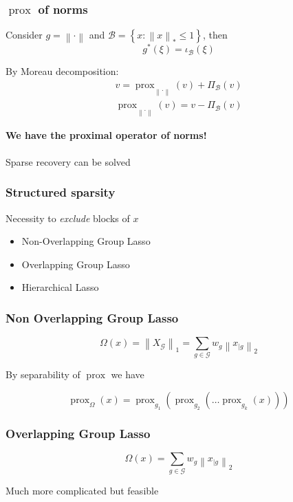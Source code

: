 \documentclass[aspectratio=169]{beamer}
\DeclareMathOperator{\Prox}{prox}
\newcommand{\prox}[2]{\Prox_{#1}\left({#2}\right)}
\newcommand{\norm}[1]{\left\|#1\right\|}
\begin{document}
		\begin{frame}
		\frametitle{$\Prox$ of norms}
		Consider $g = \norm{\cdot}$ and $\mathcal{B} = \left\{x : \norm{x}_*\le 1 \right\}$, then
		\begin{equation}
		\nonumber g^* \left(\xi\right) = \iota_\mathcal{B}\left(\xi\right)
		\end{equation}
		
		By Moreau decomposition:
		\begin{gather}
		\nonumber v = \prox{\norm{\cdot}}{v} + \Pi_{\mathcal{B}}(v)\\
		\nonumber \prox{\norm{\cdot}}{v} = v - \Pi_{\mathcal{B}}(v)
		\end{gather}
		\pause
		\begin{center}
		\textbf{We have the proximal operator of norms!}
		\quad \\ \quad \\
		
		Sparse recovery can be solved
		\end{center}
		\end{frame}
		
		\begin{frame}
		\frametitle{Structured sparsity}
		Necessity to \emph{exclude} blocks of $x$
		
		\begin{itemize}
		\item Non-Overlapping Group Lasso
		\item Overlapping Group Lasso
		\item Hierarchical Lasso
		\end{itemize}
		\end{frame}
		
		\begin{frame}
		\frametitle{Non Overlapping Group Lasso}
		\begin{equation}
		\nonumber \Omega(x) = \norm{X_\mathcal{G}}_1 = \sum_{g\in\mathcal{G}} w_g \norm{x_{|g}}_2
		\end{equation}
		\pause
		
		By separability of $\Prox$ we have
		
		\begin{equation}
		\nonumber \prox{\Omega}{x} = \prox{g_1}{\prox{g_2}{\dots\prox{g_k}{x}}}
		\end{equation}
		\end{frame}
		
		\begin{frame}
		\frametitle{Overlapping Group Lasso}
		\begin{equation}
		\nonumber \Omega(x) = \sum_{g\in\mathcal{G}} w_g \norm{x_{|g}}_2
		\end{equation}
		\pause
		
		Much more complicated \pause but feasible		
		\end{frame}
		
\end{document}
